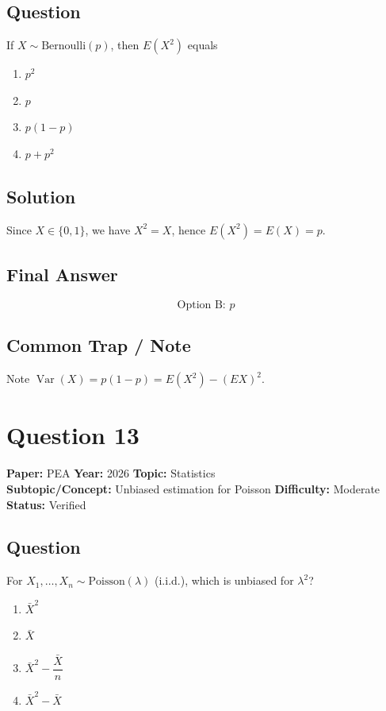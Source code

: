 \documentclass[11pt]{article}
\begin{document}
\subsection*{Question}
If $X \sim \text{Bernoulli}(p)$, then $E(X^2)$ equals
\begin{enumerate}[label=(\Alph*)]
\item $p^2$ \item $p$ \item $p(1-p)$ \item $p + p^2$
\end{enumerate}

\subsection*{Solution}
Since $X \in \{0,1\}$, we have $X^2 = X$, hence $E(X^2) = E(X) = p$.

\subsection*{Final Answer}
\[
\boxed{\text{Option B: } p}
\]

\subsection*{Common Trap / Note}
Note $\operatorname{Var}(X) = p(1-p) = E(X^2) - (E X)^2$.

\section*{Question 13}
\textbf{Paper:} PEA \quad \textbf{Year:} 2026 \quad \textbf{Topic:} Statistics \\
\textbf{Subtopic/Concept:} Unbiased estimation for Poisson \quad
\textbf{Difficulty:} Moderate \quad \textbf{Status:} Verified

\subsection*{Question}
For $X_1, \dots, X_n \sim \text{Poisson}(\lambda)$ (i.i.d.), which is unbiased for $\lambda^2$?
\begin{enumerate}[label=(\Alph*)]
\item $\bar{X}^2$
\item $\bar{X}$
\item $\bar{X}^2 - \dfrac{\bar{X}}{n}$
\item $\bar{X}^2 - \bar{X}$
\end{enumerate}
\end{document}
